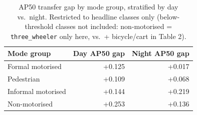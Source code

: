 \begin{table}[t]
\centering
\caption{AP50 transfer gap by mode group, stratified by day vs.\ night. Restricted to headline classes only (below-threshold classes not included: non-motorised = \texttt{three\_wheeler} only here, vs.\ + bicycle/cart in Table 2).}
\label{tab:daynight}
\begin{tabular}{lrr}
\toprule
Mode group & Day AP50 gap & Night AP50 gap \\
\midrule
Formal motorised & +0.125 & +0.017 \\
Pedestrian & +0.109 & +0.068 \\
Informal motorised & +0.144 & +0.219 \\
Non-motorised & +0.253 & +0.136 \\
\bottomrule
\end{tabular}
\end{table}
